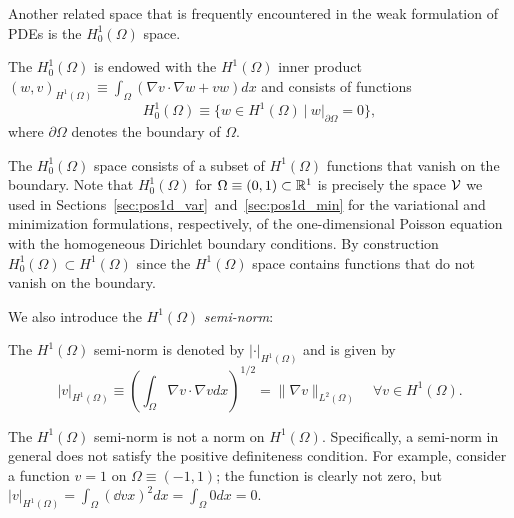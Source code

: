 Another related space that is frequently encountered in the weak formulation of PDEs is the $H^1_0(\Omega)$ space.
\begin{definition} The $H^1_0(\Omega)$ is endowed with the $H^1(\Omega)$ inner product $(w,v)_{H^1(\Omega)} \equiv \int_\Omega (\nabla v \cdot \nabla w + v w) dx$ and consists of functions
\begin{equation*}
  H^1_0(\Omega) \equiv \{ w \in H^1(\Omega) \ | \ w|_{\partial \Omega} = 0 \},
\end{equation*}
where $\partial \Omega$ denotes the boundary of $\Omega$.
\end{definition}
The $H^1_0(\Omega)$ space consists of a subset of $H^1(\Omega)$ functions that vanish on the boundary.  Note that $H^1_0(\Omega)$ for $\Omega \equiv (0,1) \subset \mathbb{R}^1$ is precisely the space $\mathcal{V}$ we used in Sections~\eqref{sec:pos1d_var}~and~\eqref{sec:pos1d_min} for the variational and minimization formulations, respectively, of the one-dimensional Poisson equation with the homogeneous Dirichlet boundary conditions.  By construction $H^1_0(\Omega) \subset H^1(\Omega)$ since the $H^1(\Omega)$ space contains functions that do not vanish on the boundary.

We also introduce the $H^1(\Omega)$ \emph{semi-norm}:
\begin{definition}
  The $H^1(\Omega)$ semi-norm is denoted by $| \cdot |_{H^1(\Omega)}$ and is given by
  \begin{equation*}
    | v |_{H^1(\Omega)} \equiv \left(\int_{\Omega} \nabla v \cdot \nabla v dx \right)^{1/2} = \| \nabla v \|_{L^2(\Omega)}   \quad \forall v \in H^1(\Omega).
  \end{equation*}  
\end{definition}
  The $H^1(\Omega)$ semi-norm is not a norm on $H^1(\Omega)$.  Specifically, a semi-norm in general does not satisfy the positive definiteness condition.  For example, consider a function $v = 1$ on $\Omega \equiv (-1,1)$; the function is clearly not zero, but $|v|_{H^1(\Omega)} = \int_\Omega (\dd{v}{x})^2 dx = \int_\Omega 0 dx = 0$.

